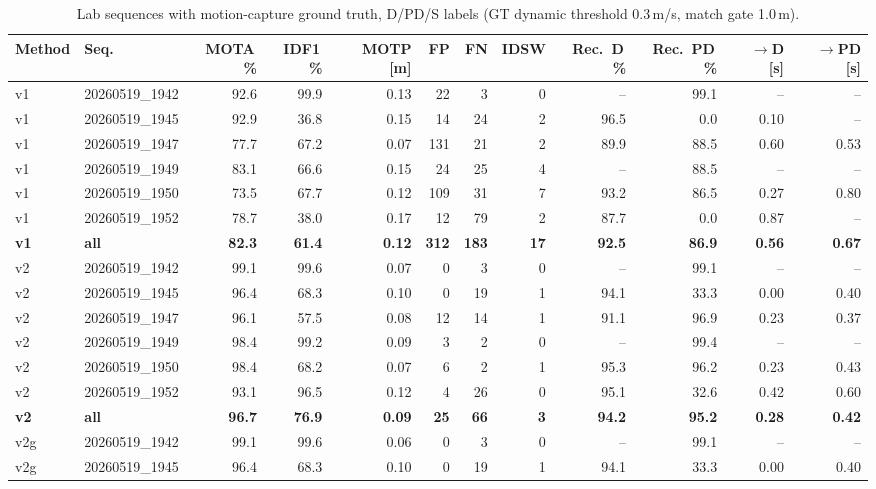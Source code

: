 \begin{table}[t]
\centering
\caption{Lab sequences with motion-capture ground truth, D/PD/S labels (GT dynamic threshold 0.3\,m/s, match gate 1.0\,m).}
\label{tab:own_r8c_full}
\setlength{\tabcolsep}{3pt}
\begin{tabular}{llrrrrrrrrrr}
\toprule
Method & Seq. & MOTA\,\% & IDF1\,\% & MOTP [m] & FP & FN & IDSW & Rec.\ D\,\% & Rec.\ PD\,\% & $\to$D [s] & $\to$PD [s] \\
\midrule
v1 & 20260519\_1942 & 92.6 & 99.9 & 0.13 & 22 & 3 & 0 & -- & 99.1 & -- & -- \\
v1 & 20260519\_1945 & 92.9 & 36.8 & 0.15 & 14 & 24 & 2 & 96.5 & 0.0 & 0.10 & -- \\
v1 & 20260519\_1947 & 77.7 & 67.2 & 0.07 & 131 & 21 & 2 & 89.9 & 88.5 & 0.60 & 0.53 \\
v1 & 20260519\_1949 & 83.1 & 66.6 & 0.15 & 24 & 25 & 4 & -- & 88.5 & -- & -- \\
v1 & 20260519\_1950 & 73.5 & 67.7 & 0.12 & 109 & 31 & 7 & 93.2 & 86.5 & 0.27 & 0.80 \\
v1 & 20260519\_1952 & 78.7 & 38.0 & 0.17 & 12 & 79 & 2 & 87.7 & 0.0 & 0.87 & -- \\
\textbf{v1} & \textbf{all} & \textbf{82.3} & \textbf{61.4} & \textbf{0.12} & \textbf{312} & \textbf{183} & \textbf{17} & \textbf{92.5} & \textbf{86.9} & \textbf{0.56} & \textbf{0.67} \\
\midrule
v2 & 20260519\_1942 & 99.1 & 99.6 & 0.07 & 0 & 3 & 0 & -- & 99.1 & -- & -- \\
v2 & 20260519\_1945 & 96.4 & 68.3 & 0.10 & 0 & 19 & 1 & 94.1 & 33.3 & 0.00 & 0.40 \\
v2 & 20260519\_1947 & 96.1 & 57.5 & 0.08 & 12 & 14 & 1 & 91.1 & 96.9 & 0.23 & 0.37 \\
v2 & 20260519\_1949 & 98.4 & 99.2 & 0.09 & 3 & 2 & 0 & -- & 99.4 & -- & -- \\
v2 & 20260519\_1950 & 98.4 & 68.2 & 0.07 & 6 & 2 & 1 & 95.3 & 96.2 & 0.23 & 0.43 \\
v2 & 20260519\_1952 & 93.1 & 96.5 & 0.12 & 4 & 26 & 0 & 95.1 & 32.6 & 0.42 & 0.60 \\
\textbf{v2} & \textbf{all} & \textbf{96.7} & \textbf{76.9} & \textbf{0.09} & \textbf{25} & \textbf{66} & \textbf{3} & \textbf{94.2} & \textbf{95.2} & \textbf{0.28} & \textbf{0.42} \\
\midrule
v2g & 20260519\_1942 & 99.1 & 99.6 & 0.06 & 0 & 3 & 0 & -- & 99.1 & -- & -- \\
v2g & 20260519\_1945 & 96.4 & 68.3 & 0.10 & 0 & 19 & 1 & 94.1 & 33.3 & 0.00 & 0.40 \\

\end{tabular}
\end{table}
